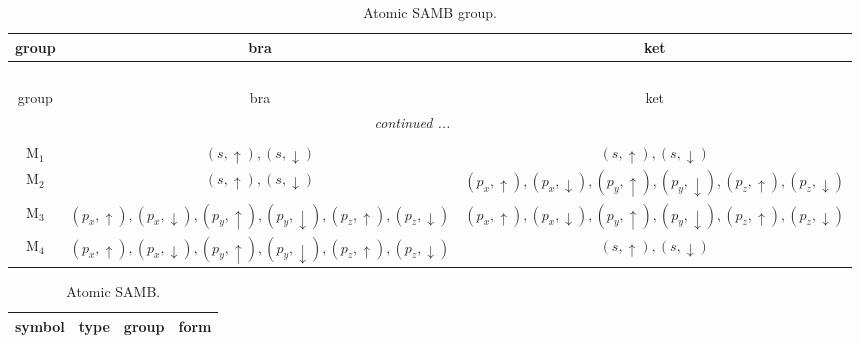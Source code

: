 \documentclass[fleqn,10pt,landscape]{article}
\begin{document}
\begin{itemize}
\begin{dmath*}
\end{dmath*}
\begin{center}
\renewcommand{\arraystretch}{1.3}
\begin{longtable}{c|c|c}
\caption{Atomic SAMB group.}
 \\
 \hline \hline
group & bra & ket \\ \hline \endfirsthead

\multicolumn{2}{l}{\tablename\ \thetable{}} \\
 \hline \hline
group & bra & ket \\ \hline \endhead

 \hline \hline
\multicolumn{2}{r}{\footnotesize\it continued ...} \\ \endfoot

 \hline \hline
\multicolumn{2}{r}{} \\ \endlastfoot

M$_{1}$ & $(s,\uparrow), (s,\downarrow)$ & $(s,\uparrow), (s,\downarrow)$ \\
M$_{2}$ & $(s,\uparrow), (s,\downarrow)$ & $(p_{x},\uparrow), (p_{x},\downarrow), (p_{y},\uparrow), (p_{y},\downarrow), (p_{z},\uparrow), (p_{z},\downarrow)$ \\
M$_{3}$ & $(p_{x},\uparrow), (p_{x},\downarrow), (p_{y},\uparrow), (p_{y},\downarrow), (p_{z},\uparrow), (p_{z},\downarrow)$ & $(p_{x},\uparrow), (p_{x},\downarrow), (p_{y},\uparrow), (p_{y},\downarrow), (p_{z},\uparrow), (p_{z},\downarrow)$ \\
M$_{4}$ & $(p_{x},\uparrow), (p_{x},\downarrow), (p_{y},\uparrow), (p_{y},\downarrow), (p_{z},\uparrow), (p_{z},\downarrow)$ & $(s,\uparrow), (s,\downarrow)$ \\
\end{longtable}
\end{center}
\begin{center}
\renewcommand{\arraystretch}{1.3}
\begin{longtable}{c|c|c|c}
\caption{Atomic SAMB.}
 \\
 \hline \hline
symbol & type & group & form \\ \hline \endfirsthead


\end{longtable}
\end{center}
\end{itemize}
\end{document}
